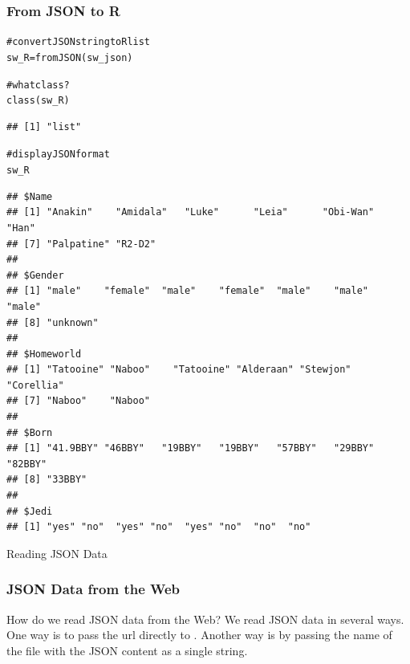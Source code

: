 \documentclass{beamer}\usepackage[]{graphicx}\usepackage[]{color}
\makeatletter
\newcommand{\hlcom}[1]{\textcolor[rgb]{0.588,0.588,0.588}{#1}}%
\newcommand{\hlstd}[1]{\textcolor[rgb]{0.196,0.196,0.196}{#1}}%
\newcommand{\hlkwb}[1]{\textcolor[rgb]{0.627,0,0.314}{#1}}%
\newcommand{\hlkwd}[1]{\textcolor[rgb]{0.78,0.227,0.412}{#1}}%
\newenvironment{kframe}{%
 \def\at@end@of@kframe{}%
 \ifinner\ifhmode%
  \def\at@end@of@kframe{\end{minipage}}%
  \begin{minipage}{\columnwidth}%
 \fi\fi%
 \def\FrameCommand##1{\hskip\@totalleftmargin \hskip-\fboxsep
 \colorbox{shadecolor}{##1}\hskip-\fboxsep
     \hskip-\linewidth \hskip-\@totalleftmargin \hskip\columnwidth}%
 \MakeFramed {\advance\hsize-\width
   \@totalleftmargin\z@ \linewidth\hsize
   \@setminipage}}%
 {\par\unskip\endMakeFramed%
 \at@end@of@kframe}
\newenvironment{knitrout}{}{} %
\makeatother
\begin{document}
\begin{frame}[fragile]
\frametitle{From JSON to R}

\begin{knitrout}\tiny
{}\color{fgcolor}\begin{kframe}
\begin{alltt}
\hlcom{# convert JSON string to R list}
\hlstd{sw_R} \hlkwb{=} \hlkwd{fromJSON}\hlstd{(sw_json)}

\hlcom{# what class?}
\hlkwd{class}\hlstd{(sw_R)}
\end{alltt}
\begin{verbatim}
## [1] "list"
\end{verbatim}
\begin{alltt}
\hlcom{# display JSON format}
\hlstd{sw_R}
\end{alltt}
\begin{verbatim}
## $Name
## [1] "Anakin"    "Amidala"   "Luke"      "Leia"      "Obi-Wan"   "Han"      
## [7] "Palpatine" "R2-D2"    
## 
## $Gender
## [1] "male"    "female"  "male"    "female"  "male"    "male"    "male"   
## [8] "unknown"
## 
## $Homeworld
## [1] "Tatooine" "Naboo"    "Tatooine" "Alderaan" "Stewjon"  "Corellia"
## [7] "Naboo"    "Naboo"   
## 
## $Born
## [1] "41.9BBY" "46BBY"   "19BBY"   "19BBY"   "57BBY"   "29BBY"   "82BBY"  
## [8] "33BBY"  
## 
## $Jedi
## [1] "yes" "no"  "yes" "no"  "yes" "no"  "no"  "no"
\end{verbatim}
\end{kframe}
\end{knitrout}

\end{frame}


\begin{frame}
 \begin{center}
  \Huge{\textcolor{mandarina}{Reading JSON Data}}
 \end{center}
\end{frame}


\begin{frame}
\frametitle{JSON Data from the Web}

\begin{block}{How do we read JSON data from the Web?}
We read JSON data in several ways. One way is to pass the url directly to . Another way is by passing  the name of the file with the JSON content as a single string.
\end{block}

\end{frame}
\end{document}
